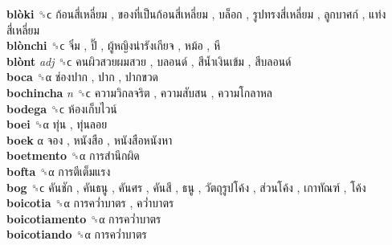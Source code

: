 \textbf{blòki} ␝ϲ   ก้อนสี่เหลี่ยม ,  ของที่เป็นก้อนสี่เหลี่ยม ,  บล็อก ,  รูปทรงสี่เหลี่ยม ,  ลูกบาศก์ ,  แท่งสี่เหลี่ยม   \\
\textbf{blònchi} ␝ϲ   จิ๋ม ,  ปิ๊ ,  ผู้หญิงน่ารังเกียจ ,  หม้อ ,  หี   \\
\textbf{blònt} \emph{adj}  ␝ϲ   คนผิวสวยผมสวย ,  บลอนด์ ,  สีน้ำเงินเข้ม ,  สีบลอนด์   \\
\textbf{boca} ␝α   ช่องปาก ,  ปาก ,  ปากขวด   \\
\textbf{bochincha} \emph{n}  ␝ϲ   ความวิกลจริต ,  ความสับสน ,  ความโกลาหล   \\
\textbf{bodega} ␝ϲ   ห้องเก็บไวน์   \\
\textbf{boei} ␝α   ทุ่น ,  ทุ่นลอย   \\
\textbf{boek} α   จอง ,  หนังสือ ,  หนังสือหนังหา   \\
\textbf{boetmento} ␝α   การสำนึกผิด   \\
\textbf{bofta} ␝α   การตีเต็มแรง   \\
\textbf{bog} ␝ϲ   คันชัก ,  คันธนู ,  คันศร ,  คันสี ,  ธนู ,  วัตถุรูปโค้ง ,  ส่วนโค้ง ,  เกาทัณฑ์ ,  โค้ง   \\
\textbf{boicotia} ␝α   การคว่ำบาตร ,  คว่ำบาตร   \\
\textbf{boicotiamento} ␝α   การคว่ำบาตร   \\
\textbf{boicotiando} ␝α   การคว่ำบาตร   \\
